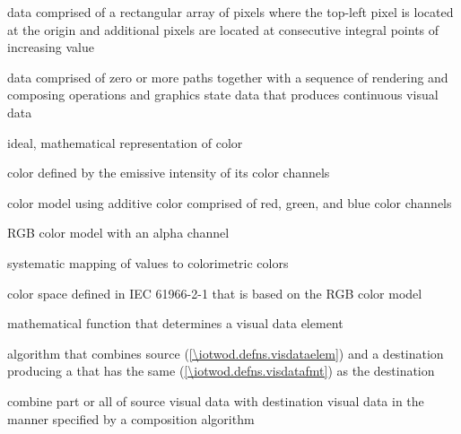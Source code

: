 %
data comprised of a rectangular array of pixels where the top-left pixel is located at the origin and additional pixels are located at consecutive integral points of increasing value

%
data comprised of zero or more paths together with a sequence of rendering and composing operations and graphics state data that produces continuous visual data

%
ideal, mathematical representation of color

%
color defined by the emissive intensity of its color channels

%
%
color model using additive color comprised of red, green, and blue color channels

%
%
RGB color model with an alpha channel

%
systematic mapping of values to colorimetric colors

%
%
color space defined in IEC 61966-2-1 that is based on the RGB color model

%
mathematical function that determines a visual data element

%
algorithm that combines source  (\ref{\iotwod.defns.visdataelem}) and a destination  producing a  that has the same  (\ref{\iotwod.defns.visdatafmt}) as the destination 

%
combine part or all of source visual data with destination visual data in the manner specified by a composition algorithm

